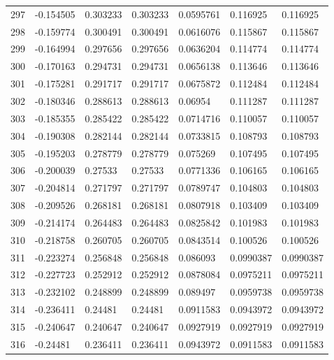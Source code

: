 \begin{longtable}{l|lll|lll}
 297 & -0.154505    & 0.303233    & 0.303233    &  0.0595761   & 0.116925    & 0.116925    \\
 298 & -0.159774    & 0.300491    & 0.300491    &  0.0616076   & 0.115867    & 0.115867    \\
 299 & -0.164994    & 0.297656    & 0.297656    &  0.0636204   & 0.114774    & 0.114774    \\
 300 & -0.170163    & 0.294731    & 0.294731    &  0.0656138   & 0.113646    & 0.113646    \\
 301 & -0.175281    & 0.291717    & 0.291717    &  0.0675872   & 0.112484    & 0.112484    \\
 302 & -0.180346    & 0.288613    & 0.288613    &  0.06954     & 0.111287    & 0.111287    \\
 303 & -0.185355    & 0.285422    & 0.285422    &  0.0714716   & 0.110057    & 0.110057    \\
 304 & -0.190308    & 0.282144    & 0.282144    &  0.0733815   & 0.108793    & 0.108793    \\
 305 & -0.195203    & 0.278779    & 0.278779    &  0.075269    & 0.107495    & 0.107495    \\
 306 & -0.200039    & 0.27533     & 0.27533     &  0.0771336   & 0.106165    & 0.106165    \\
 307 & -0.204814    & 0.271797    & 0.271797    &  0.0789747   & 0.104803    & 0.104803    \\
 308 & -0.209526    & 0.268181    & 0.268181    &  0.0807918   & 0.103409    & 0.103409    \\
 309 & -0.214174    & 0.264483    & 0.264483    &  0.0825842   & 0.101983    & 0.101983    \\
 310 & -0.218758    & 0.260705    & 0.260705    &  0.0843514   & 0.100526    & 0.100526    \\
 311 & -0.223274    & 0.256848    & 0.256848    &  0.086093    & 0.0990387   & 0.0990387   \\
 312 & -0.227723    & 0.252912    & 0.252912    &  0.0878084   & 0.0975211   & 0.0975211   \\
 313 & -0.232102    & 0.248899    & 0.248899    &  0.089497    & 0.0959738   & 0.0959738   \\
 314 & -0.236411    & 0.24481     & 0.24481     &  0.0911583   & 0.0943972   & 0.0943972   \\
 315 & -0.240647    & 0.240647    & 0.240647    &  0.0927919   & 0.0927919   & 0.0927919   \\
 316 & -0.24481     & 0.236411    & 0.236411    &  0.0943972   & 0.0911583   & 0.0911583   \\

\end{longtable}
